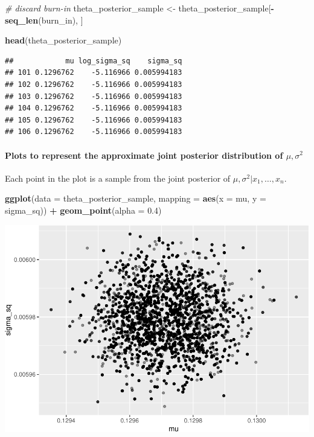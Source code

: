 \documentclass[]{article}
\newenvironment{Shaded}{\begin{snugshade}}{\end{snugshade}}
\newcommand{\KeywordTok}[1]{\textcolor[rgb]{0.13,0.29,0.53}{\textbf{#1}}}
\newcommand{\DataTypeTok}[1]{\textcolor[rgb]{0.13,0.29,0.53}{#1}}
\newcommand{\FloatTok}[1]{\textcolor[rgb]{0.00,0.00,0.81}{#1}}
\newcommand{\StringTok}[1]{\textcolor[rgb]{0.31,0.60,0.02}{#1}}
\newcommand{\CommentTok}[1]{\textcolor[rgb]{0.56,0.35,0.01}{\textit{#1}}}
\newcommand{\OperatorTok}[1]{\textcolor[rgb]{0.81,0.36,0.00}{\textbf{#1}}}
\newcommand{\NormalTok}[1]{#1}
\let\oldparagraph\paragraph
\renewcommand{\paragraph}[1]{\oldparagraph{#1}\mbox{}}
\begin{document}
\begin{Shaded}
\begin{Highlighting}[]
\CommentTok{# discard burn-in}
\NormalTok{theta_posterior_sample <-}\StringTok{ }\NormalTok{theta_posterior_sample[}\OperatorTok{-}\KeywordTok{seq_len}\NormalTok{(burn_in), ]}
\end{Highlighting}
\end{Shaded}

\begin{Shaded}
\begin{Highlighting}[]
\KeywordTok{head}\NormalTok{(theta_posterior_sample)}
\end{Highlighting}
\end{Shaded}

\begin{verbatim}
##            mu log_sigma_sq    sigma_sq
## 101 0.1296762    -5.116966 0.005994183
## 102 0.1296762    -5.116966 0.005994183
## 103 0.1296762    -5.116966 0.005994183
## 104 0.1296762    -5.116966 0.005994183
## 105 0.1296762    -5.116966 0.005994183
## 106 0.1296762    -5.116966 0.005994183
\end{verbatim}

\paragraph{\texorpdfstring{Plots to represent the approximate joint
posterior distribution of
\(\mu, \sigma^2\)}{Plots to represent the approximate joint posterior distribution of \textbackslash{}mu, \textbackslash{}sigma\^{}2}}\label{plots-to-represent-the-approximate-joint-posterior-distribution-of-mu-sigma2}

Each point in the plot is a sample from the joint posterior of
\(\mu, \sigma^2 | x_1, \ldots, x_n\).

\begin{Shaded}
\begin{Highlighting}[]
\KeywordTok{ggplot}\NormalTok{(}\DataTypeTok{data =}\NormalTok{ theta_posterior_sample, }\DataTypeTok{mapping =} \KeywordTok{aes}\NormalTok{(}\DataTypeTok{x =}\NormalTok{ mu, }\DataTypeTok{y =}\NormalTok{ sigma_sq)) }\OperatorTok{+}
\StringTok{  }\KeywordTok{geom_point}\NormalTok{(}\DataTypeTok{alpha =} \FloatTok{0.4}\NormalTok{)}
\end{Highlighting}
\end{Shaded}

\includegraphics{20190225_bayes_MCMC_Metropolis_files/figure-latex/unnamed-chunk-5-1.pdf}
\end{document}
